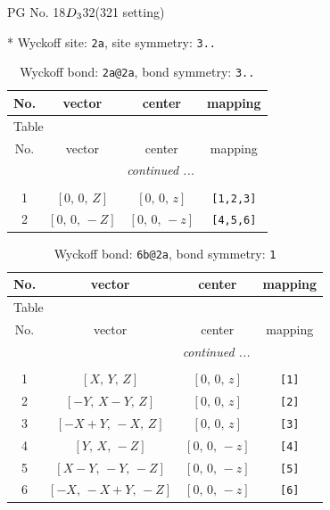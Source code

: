 \documentclass[fleqn,8pt]{jsarticle}
\begin{document}
\setcounter{MaxMatrixCols}{32}

\renewcommand{\tablename}{Table~}
\renewcommand{\figurename}{Figure~}
\begin{center}
\LARGE
PG No. 18\quad$D_{\rm 3}$\quad$32$\quad(321 setting)\quad[ trigonal ]
\end{center}


* Wyckoff site: {\tt 2a}, site symmetry: {\tt 3..}
\renewcommand{\arraystretch}{1.2}
\begin{longtable}{cccc}
\caption{Wyckoff bond: {\tt 2a@2a}, bond symmetry: {\tt 3..}}
 \\
 \hline \hline
No. & vector & center & mapping \\ \hline \endfirsthead

\multicolumn{3}{l}{\tablename\ \thetable{}} \\
 \hline \hline
No. & vector & center & mapping \\ \hline \endhead

 \hline \hline
\multicolumn{3}{r}{\footnotesize\it continued ...} \\ \endfoot

 \hline \hline
\multicolumn{3}{r}{} \\ \endlastfoot

1 & $\left[ 0,\, 0,\, Z \right]$ & $\left[ 0,\, 0,\, z \right]$ & {\tt [1,2,3]} \\ \hline
2 & $\left[ 0,\, 0,\, - Z \right]$ & $\left[ 0,\, 0,\, - z \right]$ & {\tt [4,5,6]} \\
\end{longtable}
\renewcommand{\arraystretch}{1.2}
\begin{longtable}{cccc}
\caption{Wyckoff bond: {\tt 6b@2a}, bond symmetry: {\tt 1}}
 \\
 \hline \hline
No. & vector & center & mapping \\ \hline \endfirsthead

\multicolumn{3}{l}{\tablename\ \thetable{}} \\
 \hline \hline
No. & vector & center & mapping \\ \hline \endhead

 \hline \hline
\multicolumn{3}{r}{\footnotesize\it continued ...} \\ \endfoot

 \hline \hline
\multicolumn{3}{r}{} \\ \endlastfoot

1 & $\left[ X,\, Y,\, Z \right]$ & $\left[ 0,\, 0,\, z \right]$ & {\tt [1]} \\ \hline
2 & $\left[ - Y,\, X - Y,\, Z \right]$ & $\left[ 0,\, 0,\, z \right]$ & {\tt [2]} \\ \hline
3 & $\left[ - X + Y,\, - X,\, Z \right]$ & $\left[ 0,\, 0,\, z \right]$ & {\tt [3]} \\ \hline
4 & $\left[ Y,\, X,\, - Z \right]$ & $\left[ 0,\, 0,\, - z \right]$ & {\tt [4]} \\ \hline
5 & $\left[ X - Y,\, - Y,\, - Z \right]$ & $\left[ 0,\, 0,\, - z \right]$ & {\tt [5]} \\ \hline
6 & $\left[ - X,\, - X + Y,\, - Z \right]$ & $\left[ 0,\, 0,\, - z \right]$ & {\tt [6]} \\
\end{longtable}
\end{document}
